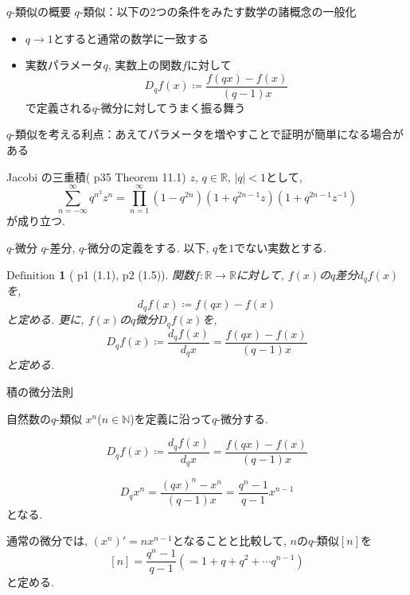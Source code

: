 \documentclass[dvipdfmx,cjk]{beamer}
\theoremstyle{mystyle}
\newtheorem{df}{$\textrm{Definition}$}[section]
\newcommand{\N}{\mathbb{N}}
\newcommand{\R}{\mathbb{R}}
\newcommand{\0}{\textbf{0}}
\begin{document}
\begin{frame}
  \tableofcontents[currentsection] 
\end{frame}

\begin{frame}{$q$-類似の概要}
  $q$-類似：以下の2つの条件をみたす数学の諸概念の一般化
  \begin{itemize}
    \item $q \to 1$とすると通常の数学に一致する
    \item 実数パラメータ$q$, 実数上の関数$f$に対して
      \[
        D_q f(x) \coloneqq \frac{f(qx) - f(x)}{(q - 1) x}
      \]
    で定義される$q$-微分に対してうまく振る舞う
  \end{itemize}
  $q$-類似を考える利点：あえてパラメータを増やすことで証明が簡単になる場合がある
  \begin{itembox}{Jacobi の三重積(\cite{Kac} p35 Theorem 11.1)}
    $z$, $q \in \R$, $|q| < 1$として, 
    \[
      \sum_{n = -\infty}^{\infty} q^{n^2} z^n =
      \prod_{n = 1}^{\infty} (1 - q^{2n})(1 + q^{2n - 1}z)(1 + q^{2n - 1}z^{-1})
    \]
    が成り立つ. 
  \end{itembox}
\end{frame}

\begin{frame}{$q$-微分}
  $q$-差分, $q$-微分の定義をする. 以下, $q$を$1$でない実数とする. 
  \begin{df}[\cite{Kac} p1 (1.1), p2 (1.5)]
    関数$f : \R \to \R$に対して, $f(x)$の$q$差分$d_q f(x)$を, 
    \[
      d_q f(x) \coloneqq f (qx) - f(x)
    \]
    と定める. 更に, $f(x)$の$q$微分$D_q f(x)$を, 
    \[
      D_q f(x) \coloneqq \frac{d_q f(x)}{d_q x} = \frac{f(qx) - f(x)}{(q - 1) x}
    \]
    と定める. 
  \end{df}
\end{frame}

\begin{frame}{積の微分法則}

\end{frame}

\begin{frame}{自然数の$q$-類似}
	$x^n$($n \in \N$)を定義に沿って$q$-微分する.
	\begin{screen}
		\[
			D_q f(x) \coloneqq \frac{d_q f(x)}{d_q x} = \frac{f(qx) - f(x)}{(q - 1) x}
		\]
	\end{screen} 
	\[
		D_q x^n = \frac{(qx)^n - x^n}{(q - 1) x} = \frac{q^n - 1}{q - 1} x^{n - 1}
	\]
  となる. 
  
  通常の微分では, $(x^n)' = n x^{n - 1}$となることと比較して, $n$の$q$-類似$[n]$を
  \[
    [n] = \frac{q^n - 1}{q - 1} (= 1 + q + q^2 + \cdots q^{n - 1})
  \]
  と定める.
\end{frame}
\end{document}
